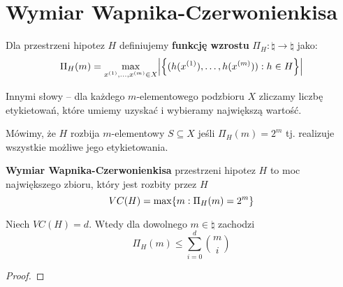 \section{Wymiar Wapnika-Czerwonienkisa}

\begin{definition}
Dla przestrzeni hipotez \( H \) definiujemy \textbf{funkcję wzrostu} \( \Pi_H : \natural \rightarrow \natural \) jako:
\[
    \Pi_H(m) = \max_{x^{(1)}, \dots, x^{(m)} \in X} \card{\set{(h(x^{(1)}), \dots, h(x^{(m)}) ) : h \in H}}
\]
\end{definition}
Innymi słowy -- dla każdego \( m \)-elementowego podzbioru \( X \) zliczamy liczbę etykietowań, które umiemy uzyskać i wybieramy największą wartość.

\begin{definition}
    Mówimy, że \( H \) rozbija \(m\)-elementowy \( S \subseteq X \) jeśli \( \Pi_H(m) = 2^m \) tj. realizuje wszystkie możliwe jego etykietowania.
\end{definition}
\begin{definition}
    \textbf{Wymiar Wapnika-Czerwonienkisa} przestrzeni hipotez \( H \) to moc największego zbioru, który jest rozbity przez \( H \)
    \[
        VC(H) = \max \set{m : \Pi_{H}(m) = 2^m}
    \]
\end{definition}

\begin{lemma}[Sauer]
    Niech \( VC(H) = d \). Wtedy dla dowolnego \( m \in \natural \) zachodzi
    \[
        \Pi_H(m) \leq \sum_{i=0}^d \binom{m}{i}
    \]
\end{lemma}
\begin{proof}
    
\end{proof}
